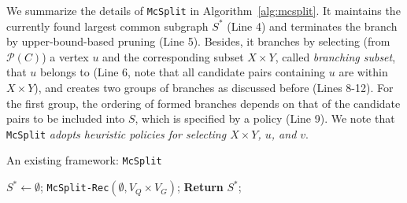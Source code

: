 \noindent\textbf{} We summarize the details of \texttt{McSplit} in Algorithm~\ref{alg:mcsplit}. It maintains the currently found largest common subgraph $S^*$ (Line 4) and terminates the branch by upper-bound-based pruning (Line 5). Besides, it branches by selecting (from $\mathcal{P}(C)$) a vertex $u$ and the corresponding subset $X\times Y$, called \emph{branching subset}, that $u$ belongs to (Line 6, note that all candidate pairs {\cheng containing} $u$ are within $X\times Y$), and creates two groups of branches as discussed before (Lines 8-12). 
%
For the first group, the ordering of formed branches depends on that of the candidate pairs to be included into $S$, which is specified by a policy (Line 9).
%
We note that \texttt{McSplit} \textit{adopts heuristic policies for selecting $X\times Y$, $u$, and $v$}. %

\begin{algorithm}[t]
\small
\caption{An existing framework: \texttt{McSplit}~\cite{mccreesh2017partitioning}}
\label{alg:mcsplit}
$S^*\leftarrow \emptyset$; 
\texttt{McSplit-Rec}$(\emptyset,V_Q\times V_G)$; \textbf{Return} $S^*$;\\
\end{algorithm}

